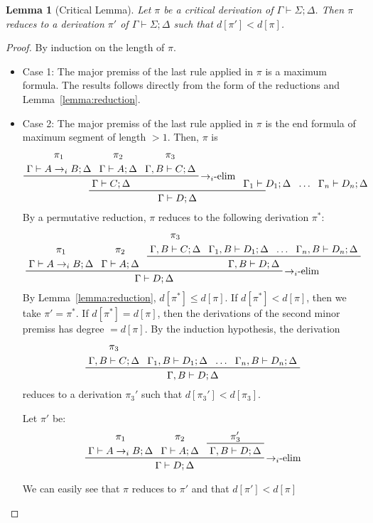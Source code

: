 \documentclass{article}
\newcommand{\efi}{$\to_i$-elim}
\newtheorem{lemma}{Lemma}
\begin{document}
\begin{lemma}[Critical Lemma]\label{lemma:critical}
  Let $\pi$ be a critical derivation of $\Gamma\vdash \Sigma; \Delta$. Then $\pi$ reduces to a derivation $\pi'$ of $\Gamma\vdash\Sigma; \Delta$ such that $d[\pi'] < d[\pi]$.
\end{lemma}
\begin{proof}
  By induction on the length of $\pi$.
  \begin{itemize}
  \item Case 1: The major premiss of the last rule applied in $\pi$ is a maximum formula. The results follows directly from the form of the reductions and Lemma~\ref{lemma:reduction}.
  \item \ttfamily{}Case 2: The major premiss of the last rule applied in $\pi$ is the end formula of maximum segment of length $> 1$.
    Then, $\pi$ is
    \[\prftree{
        \prftree[r]{\efi{}}{
          \prftree[noline]{\pi_1}{\Gamma\vdash A\to_i B; \Delta}}{
          \prftree[noline]{\pi_2}{\Gamma\vdash A; \Delta}}{
          \prftree[noline]{\pi_3}{\Gamma, B\vdash C; \Delta}}{
          \Gamma\vdash C; \Delta}}{
        \Gamma_1\vdash D_1; \Delta}{
        \dots}{
        \Gamma_n\vdash D_n; \Delta}{
        \Gamma\vdash D; \Delta}
    \]
    By a permutative reduction, $\pi$ reduces to the following derivation $\pi^*$:
    \[\prftree[r]{\efi{}}{
        \prftree[noline]{\pi_1}{\Gamma\vdash A\to_i B; \Delta}}{
        \prftree[noline]{\pi_2}{\Gamma\vdash A; \Delta}}{
        \prftree{
          \prftree[noline]{\pi_3}{\Gamma, B\vdash C; \Delta}}{
          \Gamma_1, B\vdash D_1; \Delta}{
          \dots}{
          \Gamma_n, B\vdash D_n; \Delta}{
          \Gamma, B\vdash D; \Delta}}{
        \Gamma\vdash D; \Delta}\]
    By Lemma~\ref{lemma:reduction}, $d[\pi^*]\leq d[\pi]$. If $d[\pi^*]<d[\pi]$, then we take $\pi'=\pi^*$.
    If $d[\pi^*]=d[\pi]$, then the derivations of the second minor premiss has degree $= d[\pi]$.
    By the induction hypothesis, the derivation
    \[\prftree{
        \prftree[noline]{\pi_3}{\Gamma, B\vdash C; \Delta}}{
        \Gamma_1, B\vdash D_1; \Delta}{
        \dots}{
        \Gamma_n, B\vdash D_n; \Delta}{
        \Gamma, B\vdash D; \Delta}\]
    reduces to a derivation $\pi_3'$ such that $d[\pi_3']<d[\pi_3]$.

    Let $\pi'$ be:
    \[\prftree[r]{\efi{}}{
        \prftree[noline]{\pi_1}{\Gamma\vdash A\to_i B; \Delta}}{
        \prftree[noline]{\pi_2}{\Gamma\vdash A; \Delta}}{
        \prftree{\pi_3'}{
          \Gamma, B\vdash D; \Delta}}{
        \Gamma\vdash D; \Delta}\]

    We can easily see that $\pi$ reduces to $\pi'$ and that $d[\pi']<d[\pi]$
  \end{itemize}\normalfont{}
\end{proof}
\end{document}

